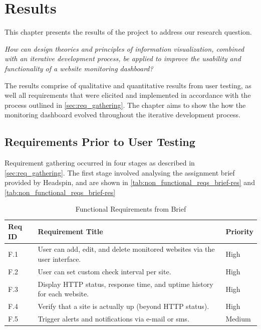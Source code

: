 \chapter{Results}
\label{ch:results}

This chapter presents the results of the project to address our research question. 
\begin{mainbox}{} 
      \textit{How can design theories and principles of information visualization, combined with an iterative development process, be applied to improve the usability and functionality of a website monitoring dashboard? }
\end{mainbox}
The results comprise of qualitative and quantitative results from user testing, as well all requirements that were elicited and implemented in accordance with the process outlined in \autoref{sec:req_gathering}. The chapter aims to show the how the monitoring dashboard evolved throughout the iterative development process.

\section{Requirements Prior to User Testing}
Requirement gathering occurred in four stages as described in \autoref{sec:req_gathering}. The first stage involved analysing the assignment brief provided by Headspin, and are shown in \autoref{tab:non_functional_reqs_brief-res} and \autoref{tab:non_functional_reqs_brief-res}


\begin{table}[H]
\centering
\caption{Functional Requirements from Brief}
\label{tab:functional_reqs_brief-res}
\begin{tabular}{| l  |p{}  |l |} 
\hline
\textbf{Req ID} & \textbf{Requirement Title} & \textbf{Priority} \\
\hline
F.1 & User can add, edit, and delete monitored websites via the user interface.& High \\ \hline 
F.2 & User can set custom check interval per site.& High \\ \hline 
F.3 & Display HTTP status, response time, and uptime history for each website.& High \\ \hline 
F.4 & Verify that a site is actually up (beyond HTTP status).& High \\ \hline 
F.5 & Trigger alerts and notifications via e-mail or sms.& Medium \\ \hline

\hline
\end{tabular}
\end{table}

